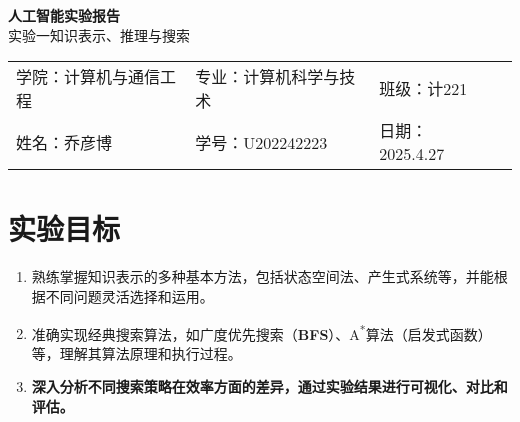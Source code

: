 \documentclass[UTF8]{ctexart}
\begin{document}
\begin{center}
  {\bfseries 人工智能实验报告}\\[1ex]
  { 实验一\quad 知识表示、推理与搜索}
\end{center}

\renewcommand{\arraystretch}{1.6}
\begin{tabular}{p{5cm}p{5.5cm}p{3cm}p{5.5cm}}
  学院：计算机与通信工程 & 专业：计算机科学与技术 & 班级：计221\\
  姓名：乔彦博 & 学号：U202242223 & 日期：2025.4.27\\
\end{tabular}

\section*{实验目标}
\begin{enumerate}
  \item 熟练掌握知识表示的多种基本方法，包括状态空间法、产生式系统等，并能根据不同问题灵活选择和运用。
  \item 准确实现经典搜索算法，如广度优先搜索（\textbf{BFS}）、A\textsuperscript{*}算法（启发式函数）等，理解其算法原理和执行过程。
  \item \textbf{深入分析不同搜索策略在效率方面的差异，通过实验结果进行可视化、对比和评估。}
\end{enumerate}

\end{document}
